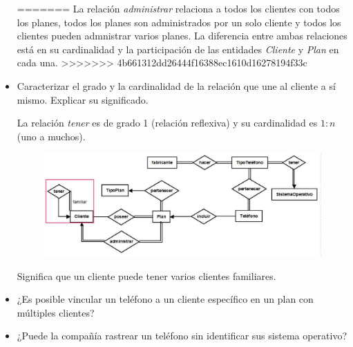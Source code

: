 \documentclass[letterpaper,11pt]{article}
\begin{document}
\begin{itemize}
=======
La relación \textit{administrar} relaciona a todos los clientes con todos los planes, todos los planes son administrados por un solo cliente y todos los clientes pueden admnistrar varios planes.
La diferencia entre ambas relaciones está en su cardinalidad y la participación de las entidades \textit{Cliente} y \textit{Plan} en cada una.
>>>>>>> 4b661312dd26444f16388ec1610d16278194f33c

    \item Caracterizar el grado y la cardinalidad de la relación que une al
    cliente a sí mismo. Explicar su significado.

    La relación \textit{tener} es de grado 1 (relación reflexiva) y su
    cardinalidad es $1:n$ (uno a muchos).

    \begin{figure}[H]
        \centering
        \includegraphics[scale=0.4]{./imagenes/modelo11.jpg}
    \end{figure}

    Significa que un cliente puede tener varios clientes familiares.
    \item ¿Es posible vincular un teléfono a un cliente específico en un plan
    con múltiples clientes?

    \item ¿Puede la compañía rastrear un teléfono sin identificar sus sistema
    operativo?

\end{itemize}
\end{document}
